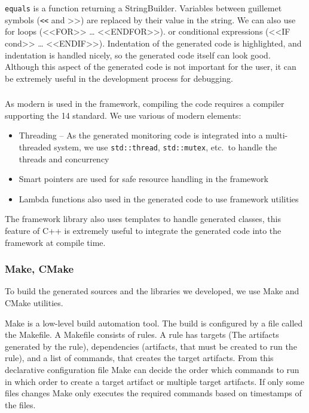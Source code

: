 \texttt{equals} is a function returning a StringBuilder.
Variables between guillemet symbols (\texttt{<<} and >>) are replaced by their value in the string. 
We can also use for loops (<<FOR>> \dots{} <<ENDFOR>>). or conditional expressions (<<IF cond>> \dots{} <<ENDIF>>).
Indentation of the generated code is highlighted, and indentation is handled nicely, so the generated code itself can look good. 
Although this aspect of the generated code is not important for the user, it can be extremely useful in the development process for debugging. 




\subsubsection{\protect\cpptt }

As modern \cpp{} is used in the framework, compiling the code requires a compiler supporting the \cpp{}14 standard.
We use various of modern \cpp{} elements:
\begin{itemize}
	\item Threading -- As the generated monitoring code is integrated into a multi-threaded system, we use \texttt{std::thread}, \texttt{std::mutex}, etc.\ to handle the threads and concurrency
	\item Smart pointers are used for safe resource handling in the framework
	\item Lambda functions also used in the generated code to use framework utilities
\end{itemize}
The framework library also uses \cpp{} templates to handle generated classes, this feature of C++ is extremely useful to integrate the generated code into the framework at compile time.

\subsubsection{ Make, CMake }

To build the generated sources and the \cpp{} libraries we developed, we use Make and CMake utilities. 


Make is a low-level build automation tool. 
The build is configured by a file called the Makefile.
A Makefile consists of rules. 
A rule has targets (The artifacts generated by the rule), dependencies (artifacts, that must be created to run the rule), and a list of commands, that creates the target artifacts. 
From this declarative configuration file Make can decide the order which commands to run in which order to create a target artifact or multiple target artifacts.
If only some files changes Make only executes the required commands based on timestamps of the files.

